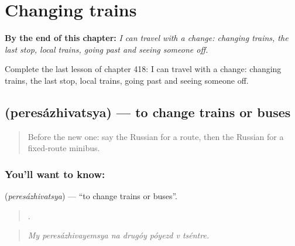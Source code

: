 
\chapter{Changing trains}
\label{ch:ru-changing-trains}

\begin{chapteropening}
\textbf{By the end of this chapter:} \emph{I can travel with a change: changing trains, the last stop, local trains, going past and seeing someone off.}

Complete the last lesson of chapter 418: I can travel with a change: changing trains, the last stop, local trains, going past and seeing someone off.
\end{chapteropening}

\section[\texorpdfstring{\ru{пересаживаться} (peresázhivatsya)}{пересаживаться (peresázhivatsya)}]{ (peresázhivatsya) — to change trains or buses}

\label{lesson:RU-C418-peresazhivatsya}



\begin{quote}
Before the new one: say the Russian for a route, then the Russian for a fixed-route minibus.
\end{quote}

\subsection*{You'll want to know: }
\textbf{} (\emph{peresázhivatsya}) — \textquotedblleft{}to change trains or buses\textquotedblright{}.

\begin{quote}
      .
\end{quote}

\begin{quote}
\emph{My peresázhivayemsya na drugóy póyezd v tséntre.}
\end{quote}

